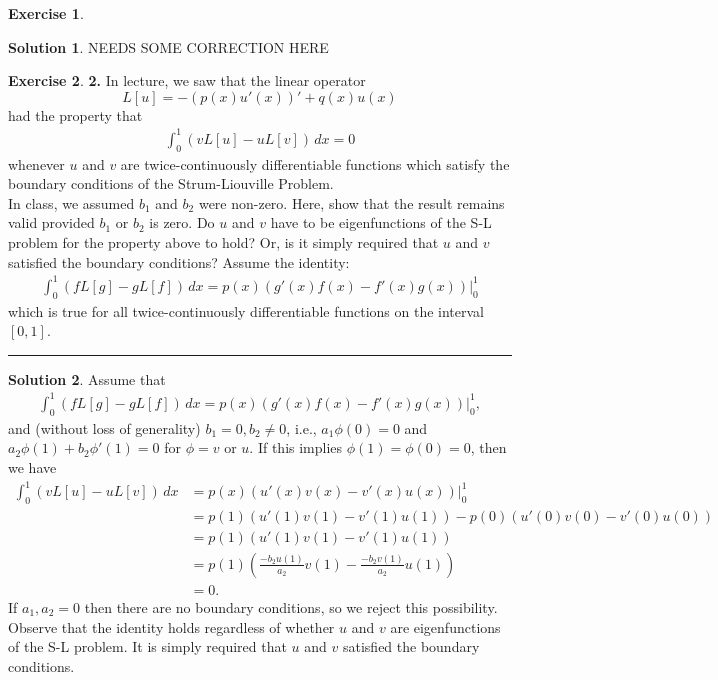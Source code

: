 \documentclass{book}
\theoremstyle{definition}
\newtheorem*{exer*}{Exercise}
\newtheorem*{sln*}{Solution}
\begin{document}
\begin{exer*}
\begin{enumerate}
\begin{sln*}
			NEEDS SOME CORRECTION HERE
			
		\end{sln*}
		
		
		
		\newpage
	\end{enumerate}
	
\end{exer*}

\newpage 

\begin{exer*}\textbf{2. } In lecture, we saw that the linear operator $$L[u] = -(p(x)u'(x))' + q(x)u(x)$$ had the property that
	\begin{align*}
	\int^1_0 (vL[u] - uL[v])\,dx = 0
	\end{align*}
	whenever $u$ and $v$ are twice-continuously differentiable functions which satisfy the boundary conditions of the Strum-Liouville Problem. \\
	
	In class, we assumed $b_1$ and $b_2$ were non-zero. Here, show that the result remains valid
	provided $b_1$ or $b_2$ is zero. Do $u$ and $v$ have to be eigenfunctions of the S-L problem for the property above to hold? Or, is it simply required that $u$ and $v$ satisfied the boundary conditions? Assume the identity:
	\begin{align*}
	\int^1_0 (fL[g] - gL[f])\,dx = p(x)(g'(x)f(x) - f'(x)g(x))\bigg\vert^1_0
	\end{align*}
	which is true for all twice-continuously differentiable functions on the interval $[0,1]$.
	
	\noindent\rule{\textwidth}{0.5pt}
	
	\begin{sln*}
		Assume that
		\begin{align*}
		\int^1_0 (fL[g] - gL[f])\,dx = p(x)(g'(x)f(x) - f'(x)g(x))\bigg\vert^1_0,
		\end{align*}
		and (without loss of generality) $b_1 = 0, b_2\neq 0$, i.e., $a_1\phi(0) = 0$ and $a_2\phi(1) + b_2\phi'(1) =0 $ for $\phi = v$ or $u$. If this implies $\phi(1) = \phi(0) = 0$, then  we have
		\begin{align*}
		\int^1_0 (vL[u] - uL[v])\,dx &= p(x)(u'(x)v(x) - v'(x)u(x))\bigg\vert^1_0\\
		&= p(1)(u'(1)v(1) - v'(1)u(1)) - p(0)(u'(0)v(0) - v'(0)u(0))\\
		&= p(1)(u'(1)v(1) - v'(1)u(1))\\
		&= p(1)\left( \frac{-b_2u(1)}{a_2}v(1) - \frac{-b_2v(1)}{a_2}u(1) \right)\\
		&= 0.
		\end{align*}
		If $a_1, a_2 = 0$ then there are no boundary conditions, so we reject this possibility.\\
		
		Observe that the identity holds regardless of whether $u$ and $v$ are eigenfunctions of the S-L problem. It is simply required that $u$ and $v$ satisfied the boundary conditions. 
	\end{sln*}
\end{exer*}
\end{document}
